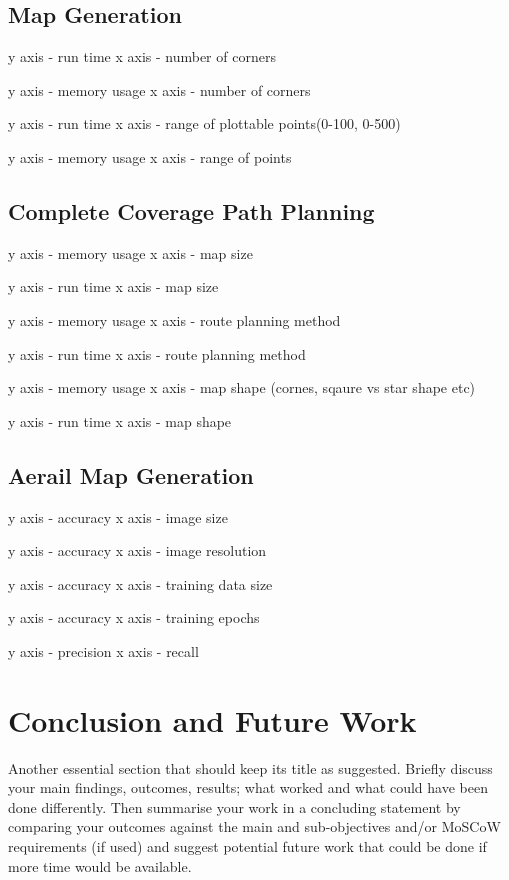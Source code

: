 \documentclass[final]{cmpreport_02}
\begin{document}
\subsection{Map Generation}

y axis - run time
x axis - number of corners

y axis - memory usage
x axis - number of corners

y axis - run time
x axis - range of plottable points(0-100, 0-500)

y axis - memory usage
x axis - range of points

\subsection{Complete Coverage Path Planning}

y axis - memory usage
x axis - map size

y axis - run time
x axis - map size

y axis - memory usage
x axis - route planning method

y axis - run time
x axis - route planning method

y axis - memory usage
x axis - map shape (cornes, sqaure vs star shape etc)

y axis - run time
x axis - map shape

\subsection{Aerail Map Generation}

y axis - accuracy
x axis - image size

y axis - accuracy
x axis - image resolution

y axis - accuracy
x axis - training data size

y axis - accuracy
x axis - training epochs

y axis - precision
x axis - recall
\section{Conclusion and Future Work}


Another essential section that should keep its title as suggested. Briefly discuss your main findings, outcomes, results; what worked and what could have been done differently. Then summarise your work in a concluding statement by comparing your outcomes against the main and sub-objectives and/or MoSCoW requirements (if used) and suggest potential future work that could be done if more time would be available.
\end{document}
